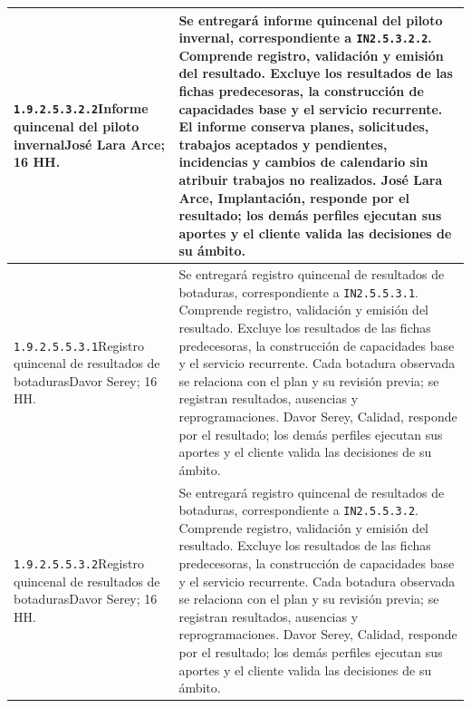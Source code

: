 \begin{longtable}{L{52mm}L{91mm}}
\texttt{1.\allowbreak{}9.\allowbreak{}2.\allowbreak{}5.\allowbreak{}3.\allowbreak{}2.\allowbreak{}2}\newline Informe quincenal del piloto invernal\newline José Lara Arce; 16 HH. & Se entregará informe quincenal del piloto invernal, correspondiente a \texttt{IN2.5.3.2.2}. Comprende registro, validación y emisión del resultado. Excluye los resultados de las fichas predecesoras, la construcción de capacidades base y el servicio recurrente.  El informe conserva planes, solicitudes, trabajos aceptados y pendientes, incidencias y cambios de calendario sin atribuir trabajos no realizados. José Lara Arce, Implantación, responde por el resultado; los demás perfiles ejecutan sus aportes y el cliente valida las decisiones de su ámbito.\\\hline
\texttt{1.\allowbreak{}9.\allowbreak{}2.\allowbreak{}5.\allowbreak{}5.\allowbreak{}3.\allowbreak{}1}\newline Registro quincenal de resultados de botaduras\newline Davor Serey; 16 HH. & Se entregará registro quincenal de resultados de botaduras, correspondiente a \texttt{IN2.5.5.3.1}. Comprende registro, validación y emisión del resultado. Excluye los resultados de las fichas predecesoras, la construcción de capacidades base y el servicio recurrente.  Cada botadura observada se relaciona con el plan y su revisión previa; se registran resultados, ausencias y reprogramaciones. Davor Serey, Calidad, responde por el resultado; los demás perfiles ejecutan sus aportes y el cliente valida las decisiones de su ámbito.\\\hline
\texttt{1.\allowbreak{}9.\allowbreak{}2.\allowbreak{}5.\allowbreak{}5.\allowbreak{}3.\allowbreak{}2}\newline Registro quincenal de resultados de botaduras\newline Davor Serey; 16 HH. & Se entregará registro quincenal de resultados de botaduras, correspondiente a \texttt{IN2.5.5.3.2}. Comprende registro, validación y emisión del resultado. Excluye los resultados de las fichas predecesoras, la construcción de capacidades base y el servicio recurrente.  Cada botadura observada se relaciona con el plan y su revisión previa; se registran resultados, ausencias y reprogramaciones. Davor Serey, Calidad, responde por el resultado; los demás perfiles ejecutan sus aportes y el cliente valida las decisiones de su ámbito.\\\hline

\end{longtable}
